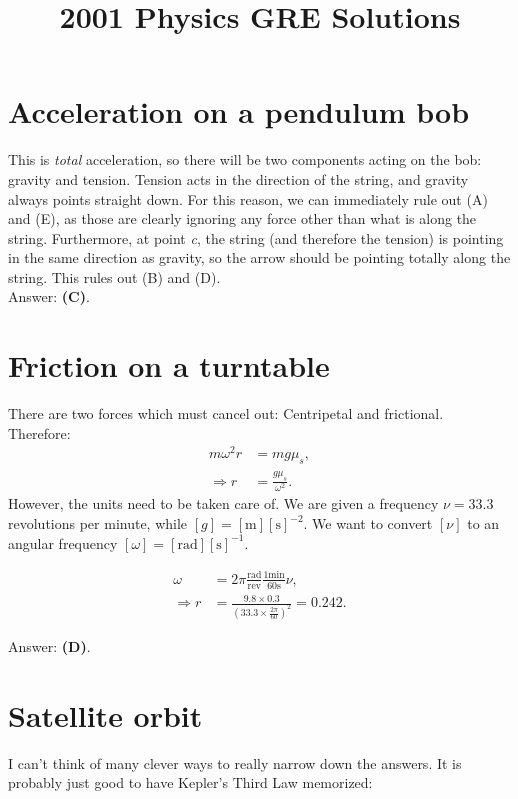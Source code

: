 \documentclass[11pt]{paper}
\title{2001 Physics GRE Solutions\blfootnote{Alex Deich, July 2016}}
\author{}
\newcommand{\answer}[1]{Answer: \textbf{(#1)}.}
\begin{document}
\maketitle
\tableofcontents
\newpage
\section{Acceleration on a pendulum bob}
This is \emph{total} acceleration, so there will be two components acting on the bob: gravity and tension.  Tension acts in the direction of the string, and gravity always points straight down.  For this reason, we can immediately rule out (A) and (E), as those are clearly ignoring any force other than what is along the string.  Furthermore, at point \emph{c}, the string (and therefore the tension) is pointing in the same direction as gravity, so the arrow should be pointing totally along the string.  This rules out (B) and (D).\\

\answer{C}

\section{Friction on a turntable}
There are two forces which must cancel out:  Centripetal and frictional.\\
Therefore:
\begin{align}
m \omega^2 r &= m g \mu_s,\\
\Rightarrow r &= \frac{g \mu_s}{\omega^2}.
\end{align}
However, the units need to be taken care of.  We are given a frequency $\nu = 33.3$ revolutions per minute, while $[g] = [\text{m}][\text{s}]^{-2}$.  We want to convert $[\nu]$ to an angular frequency $[\omega] = [\text{rad}][\text{s}]^{-1}$.

\begin{align}
\omega &= 2 \pi \frac{\text{rad}}{\text{rev}} \frac{1 \text{min}}{60 \text{s}} \nu,\\
\Rightarrow r &= \frac{9.8 \times 0.3}{\left(33.3 \times \frac{2 \pi}{60} \right)^2} = 0.242.
\end{align}

\answer{D}

\section{Satellite orbit}
I can't think of many clever ways to really narrow down the answers.  It is probably just good to have Kepler's Third Law memorized:
\end{document}
